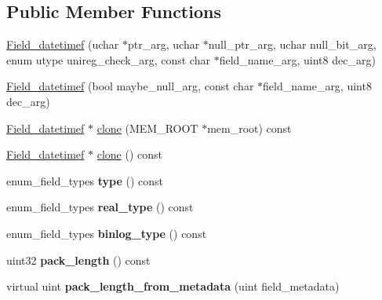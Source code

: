\subsection*{Public Member Functions}
\begin{DoxyCompactItemize}
\item 
\mbox{\hyperlink{classField__datetimef_a5eddf8844d1dfa02238889abc6a9a0a0}{Field\+\_\+datetimef}} (uchar $\ast$ptr\+\_\+arg, uchar $\ast$null\+\_\+ptr\+\_\+arg, uchar null\+\_\+bit\+\_\+arg, enum utype unireg\+\_\+check\+\_\+arg, const char $\ast$field\+\_\+name\+\_\+arg, uint8 dec\+\_\+arg)
\item 
\mbox{\hyperlink{classField__datetimef_a5a465f242f973b0135755f2c19fe2b1c}{Field\+\_\+datetimef}} (bool maybe\+\_\+null\+\_\+arg, const char $\ast$field\+\_\+name\+\_\+arg, uint8 dec\+\_\+arg)
\item 
\mbox{\hyperlink{classField__datetimef}{Field\+\_\+datetimef}} $\ast$ \mbox{\hyperlink{classField__datetimef_af05a9fd4490e889d3c00c6794eb732ab}{clone}} (M\+E\+M\+\_\+\+R\+O\+OT $\ast$mem\+\_\+root) const
\item 
\mbox{\hyperlink{classField__datetimef}{Field\+\_\+datetimef}} $\ast$ \mbox{\hyperlink{classField__datetimef_aef1cb14340d9b5e3bcd12d9314e922b4}{clone}} () const
\item 
\mbox{\label{classField__datetimef_ae63ae6f9b2f09e141ce5b01f94b161fc}} 
enum\+\_\+field\+\_\+types {\bfseries type} () const
\item 
\mbox{\label{classField__datetimef_acbea1027a56f5e9eb03165d85294fcb8}} 
enum\+\_\+field\+\_\+types {\bfseries real\+\_\+type} () const
\item 
\mbox{\label{classField__datetimef_a7942480b17f0a0219e71ffece67d4574}} 
enum\+\_\+field\+\_\+types {\bfseries binlog\+\_\+type} () const
\item 
\mbox{\label{classField__datetimef_a7ac133ece10fadfa90dab8b6b231a23f}} 
uint32 {\bfseries pack\+\_\+length} () const
\item 
\mbox{\label{classField__datetimef_acb947f706f4be41b18e53bb5fdd0942f}} 
virtual uint {\bfseries pack\+\_\+length\+\_\+from\+\_\+metadata} (uint field\+\_\+metadata)
\item 

\end{DoxyCompactItemize}
